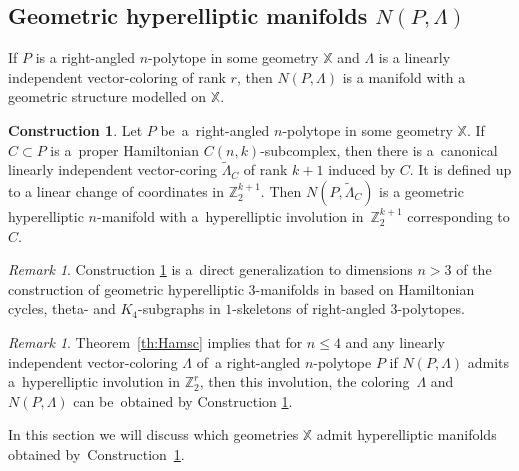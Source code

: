 \documentclass[12pt]{amsart}
\theoremstyle{definition}
\newtheorem{construction}[formula]{Construction}
\theoremstyle{remark}
\newtheorem{remark}[formula]{Remark}
\begin{document}
\subsection{Geometric hyperelliptic manifolds $N(P,\Lambda)$}\label{ssec:geom}
If $P$ is a right-angled $n$-polytope in some geometry $\mathbb X$ and $\Lambda$ is a linearly independent
vector-coloring of rank $r$, then $N(P,\Lambda)$ is a manifold with a geometric structure modelled on $\mathbb X$.

\begin{construction}\label{con:hypgeom}
Let $P$ be~a~right-angled $n$-polytope in some geometry $\mathbb X$. 
If $C\subset P$ is a~proper Hamiltonian $C(n,k)$-subcomplex, then there is a~canonical linearly independent
vector-coring $\widetilde{\Lambda}_C$ of rank $k+1$ induced by $C$. It is 
defined up to a linear change of coordinates in $\mathbb Z_2^{k+1}$. 
Then $N(P,\widetilde{\Lambda}_C)$ is a geometric hyperelliptic 
$n$-manifold with a~hyperelliptic involution in~$\mathbb Z_2^{k+1}$
corresponding to $C$.
\end{construction}
\begin{remark}
Construction \ref{con:hypgeom} is a~direct generalization 
to dimensions $n>3$ of the construction of geometric 
hyperelliptic $3$-manifolds in \cite{M90, VM99M, VM99S2} based on 
Hamiltonian cycles, theta- and $K_4$-subgraphs in $1$-skeletons of right-angled $3$-polytopes.
\end{remark}
\begin{remark}\label{rem:4hi}
Theorem~\ref{th:Hamsc} implies that for $n\leqslant 4$ and any linearly independent vector-coloring $\Lambda$
of~a right-angled $n$-polytope $P$ if $N(P,\Lambda)$ admits a~hyperelliptic involution in $\mathbb Z_2^r$,
then this involution, the coloring~$\Lambda$ and $N(P,\Lambda)$ can 
be~obtained by Construction \ref{con:hypgeom}. 
\end{remark}
In this section we will discuss which geometries $\mathbb X$ admit hyperelliptic manifolds obtained 
by~Construction~\ref{con:hypgeom}.
\end{document}
